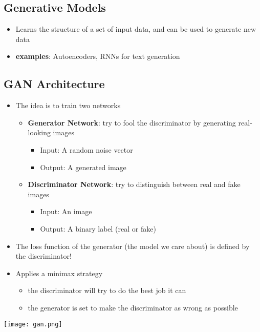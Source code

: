 \documentclass[11pt]{article}
\begin{document}
\subsection{Generative Models}
\begin{itemize}
\item Learns the structure of a set of input data, and can be used to generate new data
\item \textbf{examples}: Autoencoders, RNNs for text generation
\end{itemize}

\subsection{GAN Architecture}
\begin{itemize}
\item The idea is to train two networks
\begin{itemize}
\item \textbf{Generator Network}: try to fool the discriminator by generating real-looking images
\begin{itemize}
\item Input: A random noise vector
\item Output: A generated image
\end{itemize}
\item \textbf{Discriminator Network}: try to distinguish between real and fake images
\begin{itemize}
\item Input: An image
\item Output: A binary label (real or fake)
\end{itemize}
\end{itemize}
\item The loss function of the generator (the model we care about) is defined by the discriminator! 
\item Applies a minimax strategy
\begin{itemize}
\item the discriminator will try to do the best job it can
\item the generator is set to make the discriminator as wrong as possible
\end{itemize}
\end{itemize}

\begin{center}
\texttt{[image: gan.png]}
\end{center}
\end{document}
